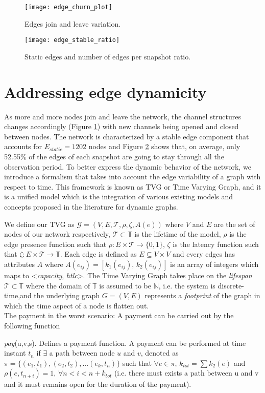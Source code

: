 	\begin{figure}[h]
		\texttt{[image: edge\_churn\_plot]}
		\caption{Edges join and leave variation.}
		\label{fig:edge_churn}
	\end{figure}

	\begin{figure}[t]
		\texttt{[image: edge\_stable\_ratio]}
		\caption{Static edges and number of edges per snapshot ratio.}
		\label{fig:edge_stable_ratio}
	\end{figure}
	
	\section{Addressing edge dynamicity}
	
	As more and more nodes join and leave the network, the channel structures changes accordingly (Figure \ref{fig:edge_churn}) with new channels being opened and closed between nodes. The network is characterized by a stable edge component that accounts for $E_{static} = 1202$ nodes and Figure \ref{fig:edge_stable_ratio} shows that, on average,  only 52.55\% of the edges of each snapshot are going to stay through all the observation period.	To better express the dynamic behavior of the network, we introduce a formalism that takes into account the edge variability of a graph with respect to time. This framework is known as TVG or Time Varying Graph, and it is a unified model which is the integration of various existing models and concepts proposed in the literature for dynamic graphs.
	
	We define our TVG as $\mathcal{G} = (V, E, \mathcal{T}, \rho, \zeta, A(e))$ where $V$ and $E$ are the set of nodes of our network respectively, $\mathcal{T} \subset \mathbb{T}$ is the lifetime of the model, $\rho$ is the edge presence function such that $\rho: E \times \mathcal{T} \to \{0,1\}$, $\zeta$ is the latency function such that $\zeta: E \times \mathcal{T} \to \mathbb{T}$.
	Each edge is defined as $E \subseteq V \times V$ and every edges has attributes $A$ where  $A(e_{ij}) = [k_1(e_{ij}),\, k_2(e_{ij})]$ is an array of integers which maps to <\textit{capacity}, \textit{htlc}>. The Time Varying Graph takes place on the \textit{lifespan} $\mathcal{T}  \subset \mathbb{T}$ where the domain of $\mathbb{T}$ is assumed to be $\mathbb{N}$, i.e. the system is discrete-time,and the underlying graph $G = (V, E)$ represents a \textit{footprint} of the graph in which the time aspect of a node is flatten out. \\
	The payment in the worst scenario:
	A payment can be carried out by the following function
	\begin{definition}
		\textit{pay}(u,v,s). Defines a payment function. A payment can be performed at time instant $t_n$ if $\exists$ a path between node $u$ and $v$, denoted as $\pi =  \{(e_1,t_1), (e_2, t_2), ... (e_k, t_n)\}$ such that $\forall e \in \pi, \, k_{tot} = \sum k_2(e)$  and $\rho(e, t_{n+i}) = 1, \, \forall n < i < n + k_{tot}$ (i.e. there must exists a path between u and v and it must remains open for the duration of the payment).
	\end{definition}
	
		
	
	
	
